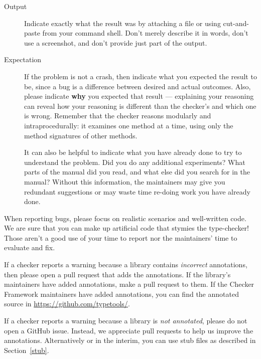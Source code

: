 \begin{description}
\item[Output]
  Indicate exactly what the result was by attaching a file or using
  cut-and-paste from your command shell.  Don't merely describe it in
  words, don't use a screenshot, and don't provide just part of the output.

\item[Expectation]
  If the problem is not a crash, then
  indicate what you expected the result to be, since a bug is a difference
  between desired and actual outcomes.  Also, please indicate \textbf{why}
  you expected that result --- explaining your reasoning can reveal
  how your reasoning is different than the checker's and which
  one is wrong.  Remember that the checker reasons modularly and
  intraprocedurally:  it examines one method at a time, using only the
  method signatures of other methods.

  It can also be helpful to indicate what you have already done to try to
  understand the problem.  Did you do any additional experiments?  What
  parts of the manual did you read, and what else did you search for in the
  manual?  Without this information, the maintainers may give you redundant
  suggestions or may waste time re-doing work you have already done.
\end{description}


When reporting bugs, please focus on realistic scenarios and well-written
code.  We are sure that you can make up artificial code that stymies the
type-checker!  Those aren't a good use of your time to report nor the
maintainers' time to evaluate and fix.



If a checker reports a warning because a library contains \emph{incorrect} annotations,
then please open a pull request that adds the annotations.  If the
library's maintainers have added annotations, make a pull request to them.
If the Checker Framework maintainers have added annotations,
you can find the annotated source in \url{https://github.com/typetools/}.

If a checker reports a warning because a library is \emph{not
annotated}, please do not open a GitHub issue.
Instead, we appreciate pull requests to help us improve the annotations.
Alternatively or in the interim, you can use stub files as described in
Section~\ref{stub}.

